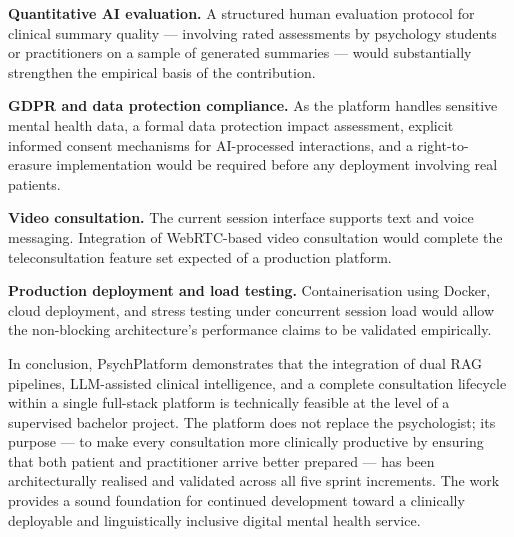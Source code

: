 \documentclass[a4paper,12pt]{report}
\begin{document}
\textbf{Quantitative AI evaluation.} A structured human evaluation protocol
for clinical summary quality — involving rated assessments by psychology
students or practitioners on a sample of generated summaries — would
substantially strengthen the empirical basis of the contribution.

\textbf{GDPR and data protection compliance.} As the platform handles
sensitive mental health data, a formal data protection impact assessment,
explicit informed consent mechanisms for AI-processed interactions, and
a right-to-erasure implementation would be required before any deployment
involving real patients.

\textbf{Video consultation.} The current session interface supports text
and voice messaging. Integration of WebRTC-based video consultation would
complete the teleconsultation feature set expected of a production platform.

\textbf{Production deployment and load testing.} Containerisation using
Docker, cloud deployment, and stress testing under concurrent session
load would allow the non-blocking architecture's performance claims to
be validated empirically.

\vspace{0.8cm}

\noindent
In conclusion, PsychPlatform demonstrates that the integration of dual RAG
pipelines, LLM-assisted clinical intelligence, and a complete consultation
lifecycle within a single full-stack platform is technically feasible at
the level of a supervised bachelor project. The platform does not replace
the psychologist; its purpose — to make every consultation more clinically
productive by ensuring that both patient and practitioner arrive better
prepared — has been architecturally realised and validated across all five
sprint increments. The work provides a sound foundation for continued
development toward a clinically deployable and linguistically inclusive
digital mental health service.

\cleardoublepage
{}
{}


\end{document}
